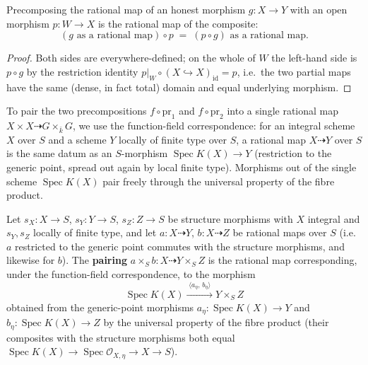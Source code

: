\begin{lemma}\leanok
  \label{lem:rationalMap_precomp_hom}
  Precomposing the rational map of an honest morphism \(g \colon X \to Y\) with an open
  morphism \(p \colon W \to X\) is the rational map of the composite:
  \[
    (g \text{ as a rational map}) \circ p \;=\; (p \circ g) \text{ as a rational map} .
  \]
\end{lemma}
\begin{proof}\leanok
  Both sides are everywhere-defined; on the whole of \(W\) the left-hand side is
  \(p \circ g\) by the restriction identity \(p|_{W} \circ (X \hookrightarrow X)_{\mathrm{id}}
  = p\), i.e.\ the two partial maps have the same (dense, in fact total) domain and equal
  underlying morphism.
\end{proof}

To pair the two precompositions \(f \circ \mathrm{pr}_1\) and \(f \circ \mathrm{pr}_2\) into
a single rational map \(X \times X \dashrightarrow G \times_{\bar k} G\), we use the
function-field correspondence: for an integral scheme \(X\) over \(S\) and a scheme \(Y\)
locally of finite type over \(S\), a rational map \(X \dashrightarrow Y\) over \(S\) is the
same datum as an \(S\)-morphism \(\operatorname{Spec} K(X) \to Y\) (restriction to the generic
point, spread out again by local finite type). Morphisms out of the single scheme
\(\operatorname{Spec} K(X)\) pair freely through the universal property of the fibre product.

\begin{definition}\leanok
  \label{def:rationalMap_prod}
  Let \(s_X \colon X \to S\), \(s_Y \colon Y \to S\), \(s_Z \colon Z \to S\) be structure
  morphisms with \(X\) integral and \(s_Y, s_Z\) locally of finite type, and let
  \(a \colon X \dashrightarrow Y\), \(b \colon X \dashrightarrow Z\) be rational maps over
  \(S\) (i.e.\ \(a\) restricted to the generic point commutes with the structure morphisms,
  and likewise for \(b\)). The \textbf{pairing} \(a \times_S b \colon X \dashrightarrow
  Y \times_S Z\) is the rational map corresponding, under the function-field correspondence,
  to the morphism
  \[
    \operatorname{Spec} K(X)
    \xrightarrow{\;\langle a_\eta,\, b_\eta \rangle\;}
    Y \times_S Z
  \]
  obtained from the generic-point morphisms \(a_\eta \colon \operatorname{Spec} K(X) \to Y\)
  and \(b_\eta \colon \operatorname{Spec} K(X) \to Z\) by the universal property of the fibre
  product (their composites with the structure morphisms both equal
  \(\operatorname{Spec} K(X) \to \operatorname{Spec}\mathcal O_{X,\eta} \to X \to S\)).
\end{definition}

